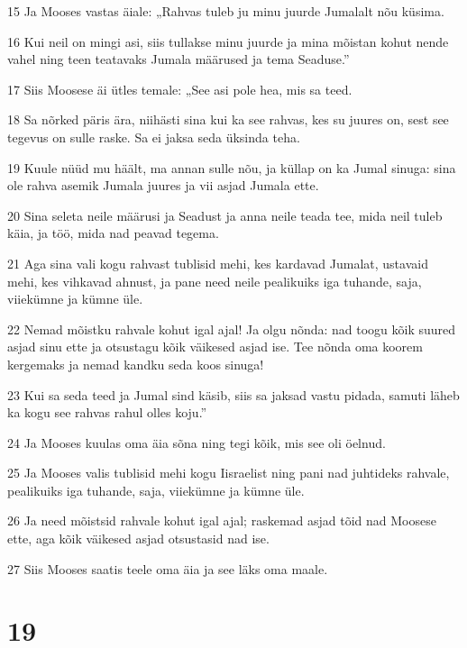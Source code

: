\par 15 Ja Mooses vastas äiale: „Rahvas tuleb ju minu juurde Jumalalt nõu küsima.
\par 16 Kui neil on mingi asi, siis tullakse minu juurde ja mina mõistan kohut nende vahel ning teen teatavaks Jumala määrused ja tema Seaduse.”
\par 17 Siis Moosese äi ütles temale: „See asi pole hea, mis sa teed.
\par 18 Sa nõrked päris ära, niihästi sina kui ka see rahvas, kes su juures on, sest see tegevus on sulle raske. Sa ei jaksa seda üksinda teha.
\par 19 Kuule nüüd mu häält, ma annan sulle nõu, ja küllap on ka Jumal sinuga: sina ole rahva asemik Jumala juures ja vii asjad Jumala ette.
\par 20 Sina seleta neile määrusi ja Seadust ja anna neile teada tee, mida neil tuleb käia, ja töö, mida nad peavad tegema.
\par 21 Aga sina vali kogu rahvast tublisid mehi, kes kardavad Jumalat, ustavaid mehi, kes vihkavad ahnust, ja pane need neile pealikuiks iga tuhande, saja, viiekümne ja kümne üle.
\par 22 Nemad mõistku rahvale kohut igal ajal! Ja olgu nõnda: nad toogu kõik suured asjad sinu ette ja otsustagu kõik väikesed asjad ise. Tee nõnda oma koorem kergemaks ja nemad kandku seda koos sinuga!
\par 23 Kui sa seda teed ja Jumal sind käsib, siis sa jaksad vastu pidada, samuti läheb ka kogu see rahvas rahul olles koju.”
\par 24 Ja Mooses kuulas oma äia sõna ning tegi kõik, mis see oli öelnud.
\par 25 Ja Mooses valis tublisid mehi kogu Iisraelist ning pani nad juhtideks rahvale, pealikuiks iga tuhande, saja, viiekümne ja kümne üle.
\par 26 Ja need mõistsid rahvale kohut igal ajal; raskemad asjad tõid nad Moosese ette, aga kõik väikesed asjad otsustasid nad ise.
\par 27 Siis Mooses saatis teele oma äia ja see läks oma maale.

\chapter{19}

